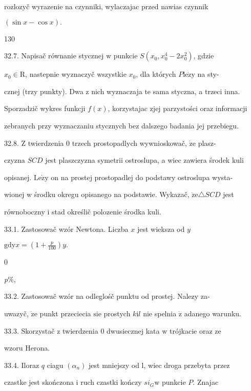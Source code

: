 \documentclass[a4paper,12pt]{article}
\begin{document}
rozlozyč wyrazenie na czynniki, wylaczajac przed nawias czynnik

$(\sin x-\cos x).$





130

32.7. Napisač równanie stycznej $\mathrm{w}$ punkcie $S(x_{0},x_{0}^{4}-2x_{0}^{2})$, gdzie

$x_{0} \in \mathrm{R}$, nastepnie wyznaczyč wszystkie $x_{0}$, dla których $P \mathrm{l}\mathrm{e}\dot{\mathrm{z}}\mathrm{y}$ na sty-

cznej (trzy punkty). Dwa $\mathrm{z}$ nich wyznaczaja $\mathrm{t}\mathrm{e}$ sama styczna, a trzeci inna.

Sporzadzič wykres funkcji $f(x)$, korzystajac zjej parzystości oraz informacji

zebranych przy wyznaczaniu stycznych bez dalszego badania jej przebiegu.

32.8. $\mathrm{Z}$ twierdzenia $0$ trzech prostopadlych wywnioskowač, $\dot{\mathrm{z}}\mathrm{e}$ plasz-

czyzna $SCD$ jest plaszczyzna symetrii ostroslupa, a wiec zawiera środek kuli

opisanej. $\mathrm{L}\mathrm{e}\dot{\mathrm{z}}\mathrm{y}$ on na prostej prostopadlej do podstawy ostroslupa wysta-

wionej $\mathrm{w}$ środku okregu opisanego na podstawie. Wykazač, $\dot{\mathrm{z}}\mathrm{e}\triangle SCD$ jest

równoboczny $\mathrm{i}$ stad określič polozenie środka kuli.

33.1. Zastosowač wzór Newtona. Liczba $x$ jest wieksza od $y$

$\mathrm{g}\mathrm{d}\mathrm{y}x= (1+\displaystyle \frac{p}{100})y.$

0

{\it p}\%,

33.2. Zastosowač wzór na odleglośč punktu od prostej. Nalezy za-

uwazyč, $\dot{\mathrm{z}}\mathrm{e}$ punkt przeciecia $\mathrm{s}\mathrm{i}\mathrm{e}$ prostych $k\mathrm{i}l$ nie spelnia $\dot{\mathrm{z}}$ adanego warunku.

33.3. Skorzystač $\mathrm{z}$ twierdzenia $0$ dwusiecznej kata $\mathrm{w}$ trójkacie oraz ze

wzoru Herona.

33.4. Iloraz $q$ ciagu $(\alpha_{n})$ jest mniejszy od l, wiec droga przebyta przez

czastke jest skończona $\mathrm{i}$ ruch czastki kończy $si_{G} \mathrm{w}$ punkcie $P$. Znajac
\end{document}
